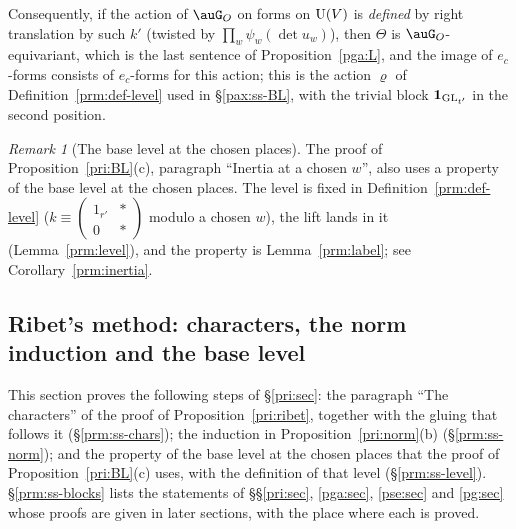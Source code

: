 \documentclass[10pt]{amsart}
\theoremstyle{definition}
\theoremstyle{remark}
\newtheorem{remark}[theorem]{Remark}
\providecommand{\plone}{\mathbf 1}
\begin{document}
Consequently, if the action of $\auG_O$ on forms on $\auU(V)$ is \emph{defined} by right translation
by such $k'$ (twisted by $\prod_w\psi_w(\det u_w)$), then $\Theta$ is $\auG_O$-equivariant, which is
the last sentence of Proposition~\ref{pga:L}, and the image of $e_c$-forms consists of $e_c$-forms
for this action; this is the action $\varrho$ of Definition~\ref{prm:def-level} used in
\S\ref{pax:ss-BL}, with the trivial block $\mathbf 1_{\auGL_{t'}}$ in the second position.

\begin{remark}[The base level at the chosen places]\label{pay:rem-level}
The proof of Proposition~\ref{pri:BL}(c), paragraph ``Inertia at a chosen $w$'', also uses a property
of the base level at the chosen places. The level is fixed in
Definition~\ref{prm:def-level} ($k\equiv\left(\begin{smallmatrix}1_{r'}&*\\0&*\end{smallmatrix}\right)$
modulo a chosen $w$), the lift lands in it (Lemma~\ref{prm:level}), and the property is
Lemma~\ref{prm:label}; see Corollary~\ref{prm:inertia}.
\end{remark}



\providecommand{\auO}{\mathcal O}
\providecommand{\auGL}{\mathrm{GL}}
\providecommand{\auF}{\mathbb F}
\providecommand{\auU}{\mathrm U}
\providecommand{\pgG}{G_E}
\providecommand{\pgtr}{\operatorname{tr}}
\providecommand{\priFitt}{\operatorname{Fitt}}
\providecommand{\prival}{\operatorname{val}}
\providecommand{\priAug}{\mathfrak I}
\providecommand{\priT}{\mathbb T}
\providecommand{\priX}{\mathcal X}
\providecommand{\priJ}{\mathcal J}
\providecommand{\prid}{\mathcal D}
\providecommand{\priN}{\mathcal N}
\providecommand{\prity}{\mathrm{ty}}
\providecommand{\plone}{\mathbf 1}
\providecommand{\prmL}{\Lambda}
\providecommand{\prmT}{\mathfrak T}
\providecommand{\prmK}{\mathfrak K}
\providecommand{\prmval}{\operatorname{vl}}
\providecommand{\prmgen}{\mathrm{gen}}
\providecommand{\prmn}{\mathfrak n}
\providecommand{\prmq}{\mathfrak q}

\subsection{Ribet's method: characters, the norm induction and the base level}\label{prm:sec}

This section proves the following steps of \S\ref{pri:sec}: the paragraph ``The characters'' of the
proof of Proposition~\ref{pri:ribet}, together with the gluing that follows it
(\S\ref{prm:ss-chars}); the induction in Proposition~\ref{pri:norm}(b) (\S\ref{prm:ss-norm}); and the
property of the base level at the chosen places that the proof of Proposition~\ref{pri:BL}(c) uses,
with the definition of that level (\S\ref{prm:ss-level}). \S\ref{prm:ss-blocks} lists the statements
of \S\S\ref{pri:sec}, \ref{pga:sec}, \ref{pse:sec} and \ref{pg:sec} whose proofs are given in later
sections, with the place where each is proved.
\end{document}
